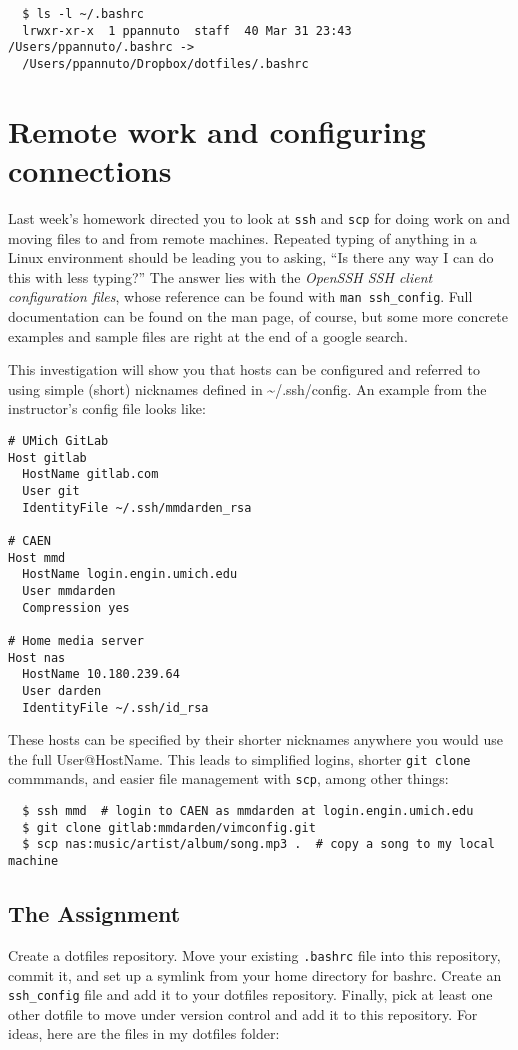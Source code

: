 \documentclass{article}
\begin{document}
\begin{lstlisting}
  $ ls -l ~/.bashrc
  lrwxr-xr-x  1 ppannuto  staff  40 Mar 31 23:43 /Users/ppannuto/.bashrc ->
  /Users/ppannuto/Dropbox/dotfiles/.bashrc
\end{lstlisting}


\section{Remote work and configuring connections}
Last week's homework directed you to look at \texttt{ssh} and \texttt{scp}
for doing work on and moving files to and from remote machines. Repeated
typing of anything in a Linux environment should be leading you to asking,
``Is there any way I can do this with less typing?'' The answer lies with the
\emph{OpenSSH SSH client configuration files}, whose reference can be found
with \texttt{man ssh\_config}. Full documentation can be found on the man
page, of course, but some more concrete examples and sample files are right
at the end of a google search.

This investigation will show you that hosts can be configured and referred to
using simple (short) nicknames defined in \textasciitilde/.ssh/config. An
example from the instructor's config file looks like:

\begin{lstlisting}
# UMich GitLab
Host gitlab
  HostName gitlab.com
  User git
  IdentityFile ~/.ssh/mmdarden_rsa

# CAEN
Host mmd
  HostName login.engin.umich.edu
  User mmdarden
  Compression yes
  
# Home media server
Host nas
  HostName 10.180.239.64
  User darden
  IdentityFile ~/.ssh/id_rsa
\end{lstlisting}

These hosts can be specified by their shorter nicknames anywhere you would
use the full User@HostName. This leads to simplified logins, shorter
\texttt{git clone} commmands, and easier file management with \texttt{scp},
among other things:

\begin{lstlisting}
  $ ssh mmd  # login to CAEN as mmdarden at login.engin.umich.edu
  $ git clone gitlab:mmdarden/vimconfig.git
  $ scp nas:music/artist/album/song.mp3 .  # copy a song to my local machine
\end{lstlisting}
  

\subsection*{The Assignment}
Create a dotfiles repository. Move your existing \texttt{.bashrc} file into
this repository, commit it, and set up a symlink from your home directory for
bashrc. Create an \texttt{ssh\_config} file and add it to your dotfiles
repository. Finally, pick at least one other dotfile to move under version
control and add it to this repository. For ideas, here are the files in my
dotfiles folder:
\end{document}
